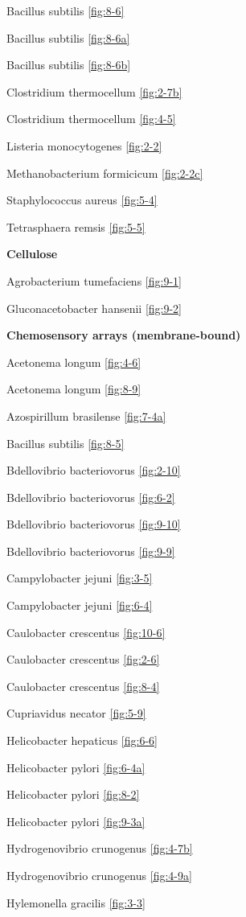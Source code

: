 \documentclass[]{tufte-book}
\begin{document}
Bacillus subtilis \ref{fig:8-6}

Bacillus subtilis \ref{fig:8-6a}

Bacillus subtilis \ref{fig:8-6b}

Clostridium thermocellum \ref{fig:2-7b}

Clostridium thermocellum \ref{fig:4-5}

Listeria monocytogenes \ref{fig:2-2}

Methanobacterium formicicum \ref{fig:2-2c}

Staphylococcus aureus \ref{fig:5-4}

Tetrasphaera remsis \ref{fig:5-5}

\textbf{Cellulose}

Agrobacterium tumefaciens \ref{fig:9-1}

Gluconacetobacter hansenii \ref{fig:9-2}

\textbf{Chemosensory arrays (membrane-bound)}

Acetonema longum \ref{fig:4-6}

Acetonema longum \ref{fig:8-9}

Azospirillum brasilense \ref{fig:7-4a}

Bacillus subtilis \ref{fig:8-5}

Bdellovibrio bacteriovorus \ref{fig:2-10}

Bdellovibrio bacteriovorus \ref{fig:6-2}

Bdellovibrio bacteriovorus \ref{fig:9-10}

Bdellovibrio bacteriovorus \ref{fig:9-9}

Campylobacter jejuni \ref{fig:3-5}

Campylobacter jejuni \ref{fig:6-4}

Caulobacter crescentus \ref{fig:10-6}

Caulobacter crescentus \ref{fig:2-6}

Caulobacter crescentus \ref{fig:8-4}

Cupriavidus necator \ref{fig:5-9}

Helicobacter hepaticus \ref{fig:6-6}

Helicobacter pylori \ref{fig:6-4a}

Helicobacter pylori \ref{fig:8-2}

Helicobacter pylori \ref{fig:9-3a}

Hydrogenovibrio crunogenus \ref{fig:4-7b}

Hydrogenovibrio crunogenus \ref{fig:4-9a}

Hylemonella gracilis \ref{fig:3-3}
\end{document}
